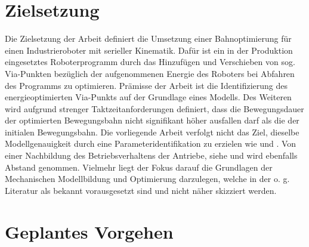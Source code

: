 \section{Zielsetzung}
Die Zielsetzung der Arbeit definiert die Umsetzung einer Bahnoptimierung für einen Industrieroboter mit serieller Kinematik. Dafür ist ein in der Produktion eingesetztes Roboterprogramm durch das Hinzufügen und Verschieben von sog. Via-Punkten bezüglich
der aufgenommenen Energie des Roboters bei Abfahren des Programms zu optimieren. Prämisse der Arbeit ist die Identifizierung des energieoptimierten Via-Punkts auf der Grundlage eines Modells. Des Weiteren wird aufgrund strenger Taktzeitanforderungen definiert, dass die Bewegungsdauer der optimierten Bewegungsbahn nicht signifikant höher ausfallen darf als die der initialen Bewegungsbahn. Die vorliegende Arbeit verfolgt nicht das Ziel, dieselbe Modellgenauigkeit durch eine Parameteridentifikation zu erzielen wie \cite{Pellicciari.2011} und \cite{Gattringer.2013}. Von einer Nachbildung des Betriebsverhaltens der Antriebe, siehe \cite{Eggers.2019} und \cite{Ziaukas.2017} wird ebenfalls Abstand genommen. Vielmehr liegt der Fokus darauf die Grundlagen der Mechanischen Modellbildung und Optimierung darzulegen, welche in der o. g. Literatur als bekannt vorausgesetzt sind und nicht näher skizziert werden. 	
\section{Geplantes Vorgehen}
